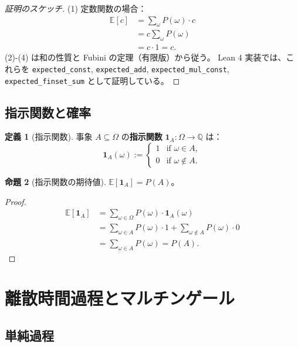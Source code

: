 \documentclass[a4paper,12pt]{ltjsarticle}
\theoremstyle{definition}
\newtheorem{definition}{定義}[section]
\newtheorem{proposition}[definition]{命題}
\begin{document}
\begin{proof}[証明のスケッチ]
(1) 定数関数の場合：
\begin{align*}
  \mathbb{E}[c] &= \sum_{\omega} P(\omega) \cdot c \\
  &= c \sum_{\omega} P(\omega) \\
  &= c \cdot 1 = c.
\end{align*}
(2)-(4) は和の性質と Fubini の定理（有限版）から従う。
Lean 4 実装では、これらを \texttt{expected\_const}, \texttt{expected\_add},
\texttt{expected\_mul\_const}, \texttt{expected\_finset\_sum} として証明している。
\end{proof}

\subsection{指示関数と確率}

\begin{definition}[指示関数]
事象 $A \subseteq \Omega$ の\textbf{指示関数} $\mathbf{1}_A : \Omega \to \mathbb{Q}$ は：
\[
  \mathbf{1}_A(\omega) := \begin{cases}
    1 & \text{if } \omega \in A, \\
    0 & \text{if } \omega \notin A.
  \end{cases}
\]
\end{definition}

\begin{proposition}[指示関数の期待値]
$\mathbb{E}[\mathbf{1}_A] = P(A)$。
\end{proposition}

\begin{proof}
\begin{align*}
  \mathbb{E}[\mathbf{1}_A] &= \sum_{\omega \in \Omega} P(\omega) \cdot \mathbf{1}_A(\omega) \\
  &= \sum_{\omega \in A} P(\omega) \cdot 1 + \sum_{\omega \notin A} P(\omega) \cdot 0 \\
  &= \sum_{\omega \in A} P(\omega) = P(A).
\end{align*}
\end{proof}

\section{離散時間過程とマルチンゲール}

\subsection{単純過程}
\end{document}
